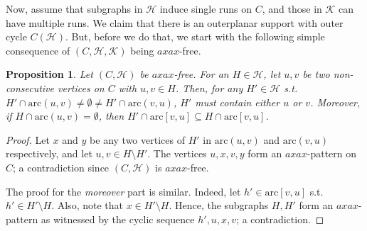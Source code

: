 \documentclass[12pt]{article}
\newcommand{\KK}{\mathcal{K}}
\newcommand{\arc}{\mathrm{arc}}
\newtheorem{proposition}[theorem]{Proposition}
\theoremstyle{case}
\begin{document}
Now, assume that subgraphs in $\mathcal{H}$ induce single runs on $C$, and those in $\KK$ can have multiple runs.
We claim that there is an outerplanar support with outer cycle $C(\mathcal{H})$. But, before we do that, we start with the following
simple consequence of $(C,\mathcal{H},\mathcal{K})$ being $axax$-free.

\begin{proposition}\label{prop:chordpartition}
Let $(C,\mathcal{H})$ be $axax$-free. For an $H\in\mathcal{H}$, let $u,v$ be two non-consecutive vertices on $C$ with $u,v\in H$.
Then, for any $H'\in\mathcal{H}$ s.t. $H'\cap \arc(u,v)\neq\emptyset\neq H'\cap \arc(v,u)$, $H'$ must contain either $u$ or $v$.
Moreover, if $H\cap \arc(u,v)=\emptyset$, then $H'\cap \arc[v,u]\subseteq H\cap \arc[v,u]$.
\end{proposition}
\begin{proof}
Let $x $ and $y$ be any two vertices of $H'$ in $\arc(u,v)$ and $\arc(v,u)$ respectively, and let $u,v\in H\setminus H'$.
The vertices $u,x,v,y$ form an $axax$-pattern on $C$; a contradiction since $(C,\mathcal{H})$ is $axax$-free.

The proof for the \emph{moreover} part is similar.
Indeed, let $h'\in \arc[v,u]$ s.t. $h'\in H'\setminus H$.
Also, note that $x\in H'\setminus H$. Hence, the subgraphs $H,H'$ form an $axax$-pattern as witnessed by the cyclic sequence $h',u,x,v$; a contradiction.
\end{proof}
\end{document}
